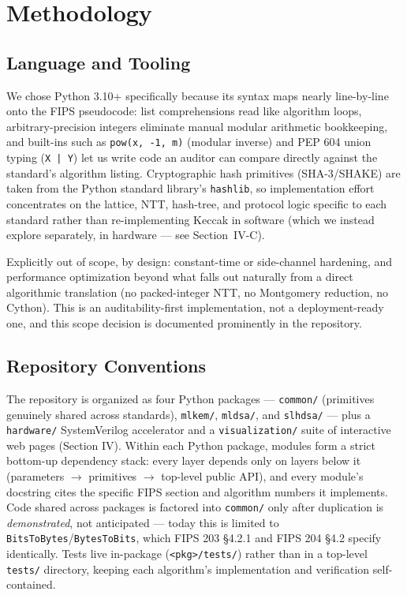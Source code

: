 \documentclass[10pt,conference]{IEEEtran}
\begin{document}
\section{Methodology}

\subsection{Language and Tooling}

We chose Python 3.10+ specifically because its syntax maps nearly
line-by-line onto the FIPS pseudocode: list comprehensions read like
algorithm loops, arbitrary-precision integers eliminate manual modular
arithmetic bookkeeping, and built-ins such as \texttt{pow(x, -1, m)}
(modular inverse) and PEP 604 union typing (\texttt{X | Y}) let us write
code an auditor can compare directly against the standard's algorithm
listing. Cryptographic hash primitives (SHA-3/SHAKE) are taken from the
Python standard library's \texttt{hashlib}, so implementation effort
concentrates on the lattice, NTT, hash-tree, and protocol logic specific
to each standard rather than re-implementing Keccak in software (which we
instead explore separately, in hardware --- see Section~IV-C).

Explicitly out of scope, by design: constant-time or side-channel
hardening, and performance optimization beyond what falls out naturally
from a direct algorithmic translation (no packed-integer NTT, no
Montgomery reduction, no Cython). This is an auditability-first
implementation, not a deployment-ready one, and this scope decision is
documented prominently in the repository.

\subsection{Repository Conventions}

The repository is organized as four Python packages --- \texttt{common/}
(primitives genuinely shared across standards), \texttt{mlkem/},
\texttt{mldsa/}, and \texttt{slhdsa/} --- plus a \texttt{hardware/}
SystemVerilog accelerator and a \texttt{visualization/} suite of
interactive web pages (Section IV). Within each Python package, modules
form a strict bottom-up dependency stack: every layer depends only on
layers below it (parameters $\rightarrow$ primitives $\rightarrow$
top-level public API), and every module's docstring cites the specific
FIPS section and algorithm numbers it implements. Code shared across
packages is factored into \texttt{common/} only after duplication is
\emph{demonstrated}, not anticipated --- today this is limited to
\texttt{BitsToBytes}/\texttt{BytesToBits}, which FIPS 203 \S4.2.1 and
FIPS 204 \S4.2 specify identically. Tests live in-package
(\texttt{<pkg>/tests/}) rather than in a top-level \texttt{tests/}
directory, keeping each algorithm's implementation and verification
self-contained.
\end{document}
